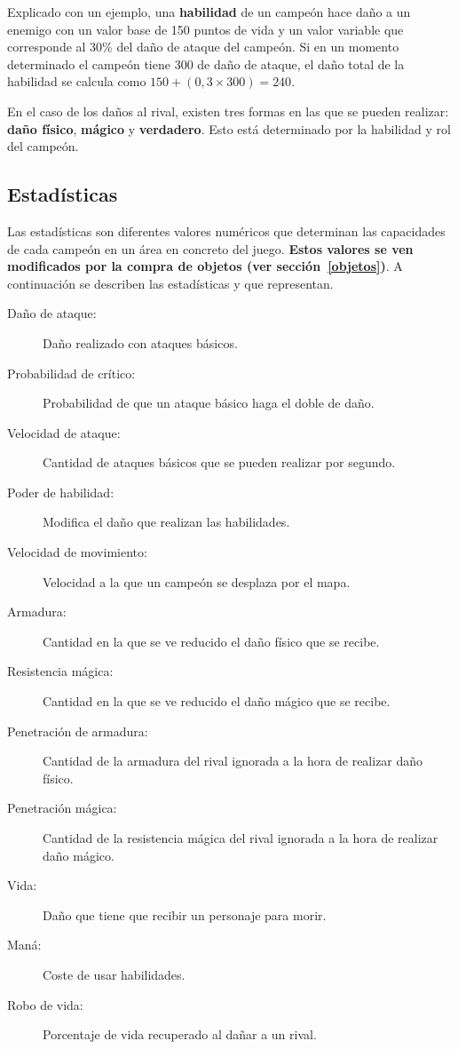 Explicado con un ejemplo, una \textbf{habilidad} de un campeón hace daño a un enemigo con un valor base de 150 puntos de vida y un valor variable que corresponde al 30\% del daño de ataque del campeón. Si en un momento determinado el campeón tiene 300 de daño de ataque, el daño total de la habilidad se calcula como $150 + (0,3 \times 300) = 240$.

En el caso de los daños al rival, existen tres formas en las que se pueden realizar: \textbf{daño físico}, \textbf{mágico} y \textbf{verdadero}. Esto está determinado por la habilidad y rol del campeón.

\subsection{Estadísticas}
\label{estadisticas}
Las estadísticas son diferentes valores numéricos que determinan las capacidades de cada campeón en un área en concreto del juego. \textbf{Estos valores se ven modificados por la compra de objetos (ver sección~\ref{objetos})}. A continuación se describen las estadísticas y que representan.
\begin{description}
	\item[Daño de ataque:] Daño realizado con ataques básicos.
	\item[Probabilidad de crítico:] Probabilidad de que un ataque básico haga el doble de daño.
	\item[Velocidad de ataque:] Cantidad de ataques básicos que se pueden realizar por segundo.
	\item[Poder de habilidad:] Modifica el daño que realizan las habilidades.
	\item[Velocidad de movimiento:] Velocidad a la que un campeón se desplaza por el mapa.
	\item[Armadura:] Cantidad en la que se ve reducido el daño físico que se recibe.
	\item[Resistencia mágica:] Cantidad en la que se ve reducido el daño mágico que se recibe.
	\item[Penetración de armadura:] Cantidad de la armadura del rival ignorada a la hora de realizar daño físico.
	\item[Penetración mágica:] Cantidad de la resistencia mágica del rival ignorada a la hora de realizar daño mágico.
	\item[Vida:] Daño que tiene que recibir un personaje para morir.
	\item[Maná:] Coste de usar habilidades.
	\item[Robo de vida:] Porcentaje de vida recuperado al dañar a un rival.
\end{description}

